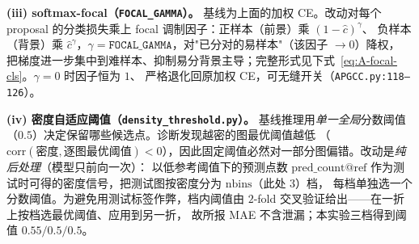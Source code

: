 \textbf{(iii) softmax-focal（\texttt{FOCAL\_GAMMA}）。}
基线为上面的加权 CE。改动对每个 proposal 的分类损失乘上 focal 调制因子：正样本（前景）乘 $(1-\hat{c})^{\gamma}$、
负样本（背景）乘 $\hat{c}^{\gamma}$，$\gamma{=}\texttt{FOCAL\_GAMMA}$，对"已分对的易样本"（该因子 $\to 0$）降权，
把梯度进一步集中到难样本、抑制易分背景主导；完整形式见下式~\eqref{eq:A-focal-cls}。$\gamma{=}0$ 时因子恒为 $1$、
严格退化回原加权 CE，可无缝开关（\texttt{APGCC.py:118--126}）。

\textbf{(iv) 密度自适应阈值（\texttt{density\_threshold.py}）。}
基线推理用\emph{单一全局}分数阈值（$0.5$）决定保留哪些候选点。诊断发现越密的图最优阈值越低
（$\mathrm{corr}(\text{密度},\text{逐图最优阈值})<0$），因此固定阈值必然对一部分图偏错。改动是\emph{纯后处理}（模型只前向一次）：
以低参考阈值下的预测点数 $\text{pred\_count}@\text{ref}$ 作为测试时可得的密度信号，把测试图按密度分为 $\text{nbins}$（此处 $3$）档，
每档单独选一个分数阈值。为避免用测试标签作弊，档内阈值由 $2$-fold 交叉验证给出——在一折上按档选最优阈值、应用到另一折，
故所报 MAE 不含泄漏；本实验三档得到阈值 $0.55/0.5/0.5$。

